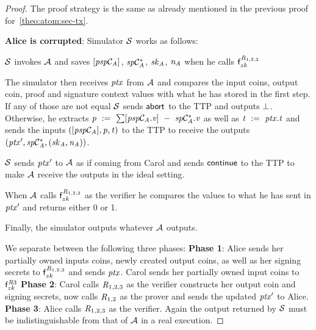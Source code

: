 \begin{proof}
    The proof strategy is the same as already mentioned in the previous proof for~\cref{theo:atom:sec-tx}.

    \textbf{Alice is corrupted}: Simulator $\mathcal{S}$ works as follows:
    \begin{asparaenum}
        \item $\mathcal{S}$ invokes $\mathcal{A}$ and saves $[\mathit{psp}\mathcal{C}_{\mathit{A}}]$, $\mathit{sp}\mathcal{C}_{\mathit{A}}^*$, $\mathit{sk}_{\mathit{A}}$, $\mathit{\mathit{n}_{\mathit{A}}}$ when he calls $\mathsf{f}^{\mathit{R}_{1,2,3}}_{zk}$
        \item The simulator then receives $\mathit{ptx}$ from $\mathcal{A}$ and compares the input coins, output coin, proof and signature context values with what he has stored in the first step.
        If any of those are not equal $\mathcal{S}$ sends $\mathsf{abort}$ to the TTP and outputs $\bot$.
        Otherwise, he extracts $\mathit{p} ~:=~ \sum [\mathit{psp}\mathcal{C}_{\mathit{A}}.\mathit{v}] ~-~ \mathit{sp}\mathcal{C}_{\mathit{A}}^*.\mathit{v}$ as well as $\mathit{t} ~:=~ \mathit{ptx}.\mathit{t}$ and sends the inputs $([\mathit{psp}\mathcal{C}_{\mathit{A}}], \mathit{p}, \mathit{t})$ to the TTP to receive the outputs $({\mathit{ptx}}', \mathit{sp}\mathcal{C}_{\mathit{A}}^*, (\mathit{sk}_{\mathit{A}}, \mathit{\mathit{n}_{\mathit{A}}}))$.
        \item $\mathcal{S}$ sends ${\mathit{ptx}}'$ to $\mathcal{A}$ as if coming from Carol and sends $\mathsf{continue}$ to the TTP to make $\mathcal{A}$ receive the outputs in the ideal setting.
        \item When $\mathcal{A}$ calls $\mathsf{f}^{\mathit{R}_{1,2,3}}_{zk}$ as the verifier he compares the values to what he has sent in ${\mathit{ptx}}'$ and returns either 0 or 1.
        \item Finally, the simulator outputs whatever $\mathcal{A}$ outputs.
    \end{asparaenum}
    We separate between the following three phases:
    \textbf{Phase 1}: Alice sends her partially owned inputs coins, newly created output coins, as well as her signing secrets to $\mathsf{f}^{\mathit{R}_{1,2,3}}_{zk}$ and sends $\mathit{ptx}$.
    Carol sends her partially owned input coins to $\mathsf{f}^{\mathit{R}{3}}_{zk}$
    \textbf{Phase 2}: Carol calls $\mathit{R}_{1,2,3}$ as the verifier constructs her output coin and signing secrets, now calls $\mathit{R}_{1,2}$ as the prover and sends the updated ${\mathit{ptx}}'$ to Alice.
    \textbf{Phase 3}: Alice calls $\mathit{R}_{1,2,3}$ as the verifier.
    Again the output returned by $\mathcal{S}$ must be indistinguishable from that of $\mathcal{A}$ in a real execution.


\end{proof}
